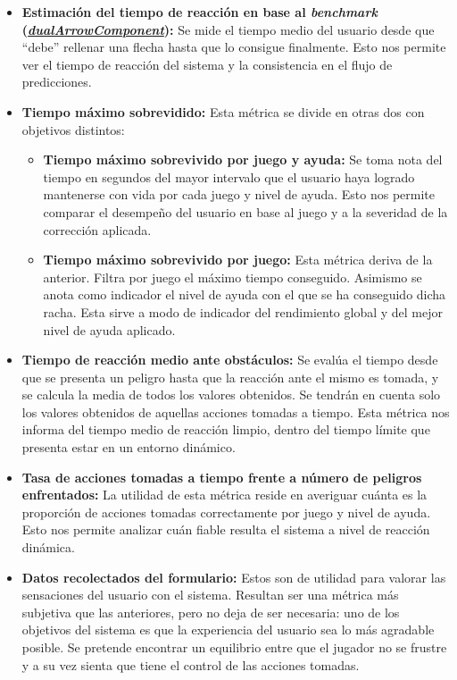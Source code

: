 \begin{itemize}
      \item \textbf{Estimación del tiempo de reacción en base al \textit{benchmark} (\hyperref[subsec:benchmark_visual]{\textit{dualArrowComponent}}):} Se mide el tiempo medio del usuario desde que ``debe'' rellenar una flecha hasta que lo consigue finalmente. Esto nos permite ver el tiempo de reacción del sistema y la consistencia en el flujo de predicciones.
      \item \textbf{Tiempo máximo sobrevidido:} Esta métrica se divide en otras dos con objetivos distintos:
            \begin{itemize}
                  \item \textbf{Tiempo máximo sobrevivido por juego y ayuda:} Se toma nota del tiempo en segundos del mayor intervalo que el usuario haya logrado mantenerse con vida por cada juego y nivel de ayuda. Esto nos permite comparar el desempeño del usuario en base al juego y a la severidad de la corrección aplicada.
                  \item \textbf{Tiempo máximo sobrevivido por juego:} Esta métrica deriva de la anterior. Filtra por juego el máximo tiempo conseguido. Asimismo se anota como indicador el nivel de ayuda con el que se ha conseguido dicha racha. Esta sirve a modo de indicador del rendimiento global y del mejor nivel de ayuda aplicado.
            \end{itemize}
      \item \textbf{Tiempo de reacción medio ante obstáculos:} Se evalúa el tiempo desde que se presenta un peligro hasta que la reacción ante el mismo es tomada, y se calcula la media de todos los valores obtenidos. Se tendrán en cuenta solo los valores obtenidos de aquellas acciones tomadas a tiempo. Esta métrica nos informa del tiempo medio de reacción limpio, dentro del tiempo límite que presenta estar en un entorno dinámico.
      \item \textbf{Tasa de acciones tomadas a tiempo frente a número de peligros enfrentados:} La utilidad de esta métrica reside en averiguar cuánta es la proporción de acciones tomadas correctamente por juego y nivel de ayuda. Esto nos permite analizar cuán fiable resulta el sistema a nivel de reacción dinámica.
      \item \textbf{Datos recolectados del formulario:} Estos son de utilidad para valorar las sensaciones del usuario con el sistema. Resultan ser una métrica más subjetiva que las anteriores, pero no deja de ser necesaria: uno de los objetivos del sistema es que la experiencia del usuario sea lo más agradable posible. Se pretende encontrar un equilibrio entre que el jugador no se frustre y a su vez sienta que tiene el control de las acciones tomadas.
\end{itemize}

